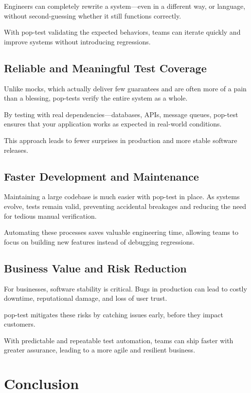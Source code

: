 \documentclass[11pt]{article}
\begin{document}
Engineers can completely rewrite a system—even in a different way, or language, without second-guessing whether it still functions correctly.

With pop-test validating the expected behaviors, teams can iterate quickly and improve systems without introducing regressions.

\subsection{Reliable and Meaningful Test Coverage}
\label{sec:org9cccf1b}

Unlike mocks, which actually deliver few guarantees and are often more of a pain than a blessing, pop-tests verify the entire system as a whole.

By testing with real dependencies—databases, APIs, message queues, pop-test ensures that your application works as expected in real-world conditions.

This approach leads to fewer surprises in production and more stable software releases.

\subsection{Faster Development and Maintenance}
\label{sec:orgf2acf8a}

Maintaining a large codebase is much easier with pop-test in place. As systems evolve, tests remain valid, preventing accidental breakages and reducing the need for tedious manual verification.

Automating these processes saves valuable engineering time, allowing teams to focus on building new features instead of debugging regressions.

\subsection{Business Value and Risk Reduction}
\label{sec:org782294b}

For businesses, software stability is critical. Bugs in production can lead to costly downtime, reputational damage, and loss of user trust.

pop-test mitigates these risks by catching issues early, before they impact customers.

With predictable and repeatable test automation, teams can ship faster with greater assurance, leading to a more agile and resilient business.

\section{Conclusion}
\label{sec:orgd8249fc}
\end{document}
